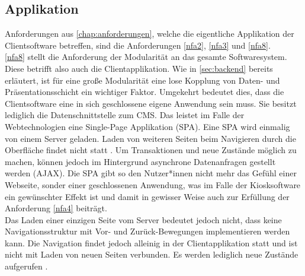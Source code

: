 \subsection{Applikation}
\label{subs:applikation}

Anforderungen aus \autoref{chap:anforderungen}, welche die eigentliche Applikation 
der Clientsoftware betreffen, sind die Anforderungen \ref{nfa2}, \ref{nfa3} und \ref{nfa8}.\\

\ref{nfa8} stellt die Anforderung der Modularität an das gesamte Softwaresystem. Diese
betrifft also auch die Clientapplikation. Wie in \autoref{sec:backend} bereits erläutert, 
ist für eine große Modularität eine lose Kopplung von Daten- und Präsentationsschicht ein
wichtiger Faktor. Umgekehrt bedeutet dies, dass die Clientsoftware eine in sich geschlossene
eigene Anwendung sein muss. Sie besitzt lediglich die Datenschnittstelle zum CMS. Das leistet im 
Falle der Webtechnologien eine Single-Page Applikation (SPA). Eine SPA wird einmalig von einem 
Server geladen. Laden von weiteren Seiten beim Navigieren durch die Oberfläche 
findet nicht statt \cite{js-definitive}. Um Transaktionen und neue Zustände möglich zu machen,
können jedoch im Hintergrund asynchrone Datenanfragen gestellt werden (AJAX). 
Die SPA gibt so den Nutzer*innen nicht mehr das Gefühl einer
Webseite, sonder einer geschlossenen Anwendung, was im Falle der Kiosksoftware ein gewünschter
Effekt ist und damit in gewisser Weise auch zur Erfüllung der Anforderung \ref{nfa4} beiträgt.\\
Das Laden einer einzigen Seite vom Server bedeutet jedoch nicht, dass keine Navigationsstruktur
mit Vor- und Zurück-Bewegungen implementieren werden kann. Die Navigation findet jedoch alleinig in 
der Clientapplikation statt und ist nicht mit Laden von neuen Seiten verbunden. Es werden lediglich
neue Zustände aufgerufen \cite{spa-manifesto}.\\

